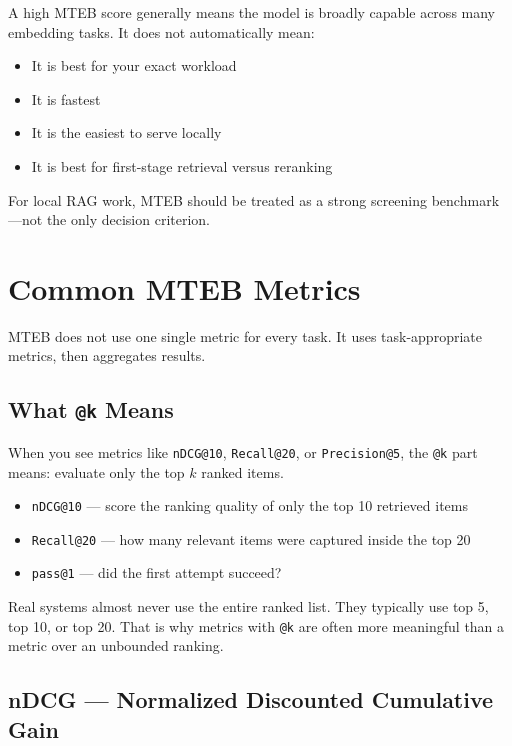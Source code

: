 A high MTEB score generally means the model is broadly capable across many embedding tasks.
It does not automatically mean:

\begin{itemize}
    \item It is best for your exact workload
    \item It is fastest
    \item It is the easiest to serve locally
    \item It is best for first-stage retrieval versus reranking
\end{itemize}

For local RAG work, MTEB should be treated as a strong screening benchmark---not the only
decision criterion.

\section{Common MTEB Metrics}

MTEB does not use one single metric for every task. It uses task-appropriate metrics, then
aggregates results.

\subsection{What \texttt{@k} Means}

When you see metrics like \texttt{nDCG@10}, \texttt{Recall@20}, or \texttt{Precision@5},
the \texttt{@k} part means: evaluate only the top $k$ ranked items.

\begin{itemize}
    \item \texttt{nDCG@10} --- score the ranking quality of only the top 10 retrieved items
    \item \texttt{Recall@20} --- how many relevant items were captured inside the top 20
    \item \texttt{pass@1} --- did the first attempt succeed?
\end{itemize}

Real systems almost never use the entire ranked list. They typically use top 5, top 10, or
top 20. That is why metrics with \texttt{@k} are often more meaningful than a metric over an
unbounded ranking.

\subsection{nDCG --- Normalized Discounted Cumulative Gain}

